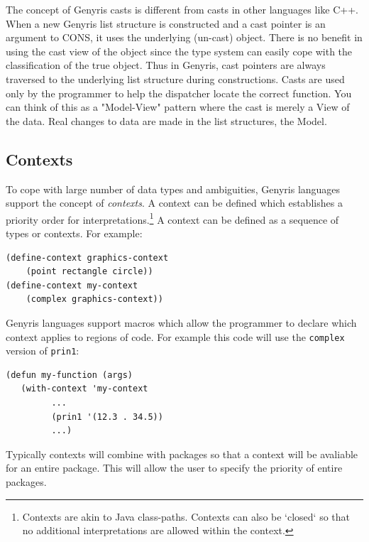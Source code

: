 \documentclass[a4paper,12pt,dvips]{article}
\begin{document}
The concept of Genyris casts is different from casts in other languages like C++. When a new Genyris list structure is constructed and a cast pointer is an argument to CONS, it uses the underlying (un-cast) object.  There is no benefit in using the cast view of the object since the type system can easily cope with the classification of the true object. Thus in Genyris, cast pointers are always traversed to the underlying list structure during constructions.  Casts are used only by the programmer to help the dispatcher locate the correct function. You can think of this as a "Model-View" pattern where the cast is merely a View of the data. Real changes to data are made in the list structures, the Model.
  

\subsection{Contexts}
To cope with large number of data types and ambiguities, Genyris languages support the concept of \emph{contexts}. A context can be defined which establishes a priority order for interpretations.\footnote{Contexts are akin to Java class-paths. Contexts can also be `closed` so that no additional interpretations are allowed within the context.}  
A context can be defined as a sequence of types or contexts. For example:
\begin{verbatim}
(define-context graphics-context
    (point rectangle circle))
(define-context my-context
    (complex graphics-context))
\end{verbatim}
Genyris languages support macros which allow the programmer to declare which context applies to regions of code. For example this code will use the \texttt{complex} version of \texttt{prin1}: 
\begin{verbatim}
(defun my-function (args)
   (with-context 'my-context
         ...
         (prin1 '(12.3 . 34.5)) 
         ...)
\end{verbatim}
Typically contexts will combine with packages so that a context will be avaliable for an entire package. This will allow the user to specify the priority of entire packages. 
\end{document}
